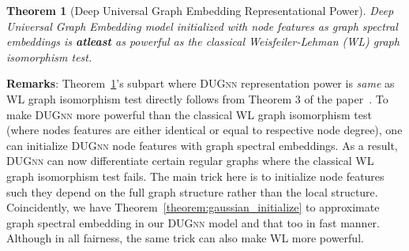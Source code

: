 \documentclass{article}
\newtheorem{theorem}{Theorem}
\begin{document}
\begin{theorem}[Deep Universal Graph Embedding Representational Power]\label{theorem:rep_power} 
	Deep Universal Graph Embedding model initialized with  node features as  graph spectral embeddings  is   \textbf{atleast} as powerful as the classical Weisfeiler-Lehman (WL) graph isomorphism test. \end{theorem}
\vspace{-0.5em}
\noindent\textbf{{Remarks}}: Theorem~\ref{theorem:rep_power}'s subpart where \textsc{DUGnn} representation power is \emph{same} as  WL graph isomorphism test  directly follows from  Theorem 3 of the paper~\cite{xu2018powerful}. To make \textsc{DUGnn} more powerful  than the classical WL graph isomorphism test (where nodes features are either  identical or equal to respective node degree), one   can initialize \textsc{DUGnn} node features with graph spectral embeddings. As a result,   \textsc{DUGnn} can now differentiate certain regular graphs where the classical  WL graph isomorphism test fails.  The main trick here is to initialize node features such they  depend on the full graph structure rather than the local structure.  Coincidently, we have Theorem~\ref{theorem:gaussian_initialize} to approximate graph spectral embedding in our \textsc{DUGnn} model and that too in fast manner. Although in all fairness, the same trick can also make   WL more powerful. 
\end{document}
